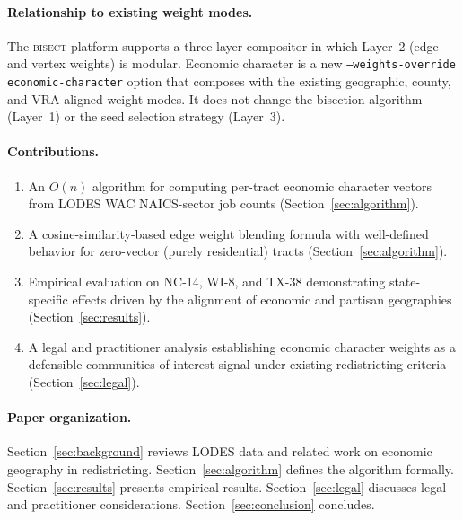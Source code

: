 \paragraph{Relationship to existing weight modes.}
The \textsc{bisect} platform supports a three-layer compositor
\citep{bisect2024} in which Layer~2 (edge and vertex weights) is modular.
Economic character is a new \texttt{--weights-override economic-character}
option that composes with the existing geographic, county, and
VRA-aligned weight modes.
It does not change the bisection algorithm (Layer~1) or the seed selection
strategy (Layer~3).

\paragraph{Contributions.}
\begin{enumerate}
  \item An $O(n)$ algorithm for computing per-tract economic character vectors
        from LODES WAC NAICS-sector job counts (Section~\ref{sec:algorithm}).
  \item A cosine-similarity-based edge weight blending formula with well-defined
        behavior for zero-vector (purely residential) tracts
        (Section~\ref{sec:algorithm}).
  \item Empirical evaluation on NC-14, WI-8, and TX-38 demonstrating
        state-specific effects driven by the alignment of economic and
        partisan geographies (Section~\ref{sec:results}).
  \item A legal and practitioner analysis establishing economic character weights
        as a defensible communities-of-interest signal under existing
        redistricting criteria (Section~\ref{sec:legal}).
\end{enumerate}

\paragraph{Paper organization.}
Section~\ref{sec:background} reviews LODES data and related work on economic
geography in redistricting.
Section~\ref{sec:algorithm} defines the algorithm formally.
Section~\ref{sec:results} presents empirical results.
Section~\ref{sec:legal} discusses legal and practitioner considerations.
Section~\ref{sec:conclusion} concludes.
